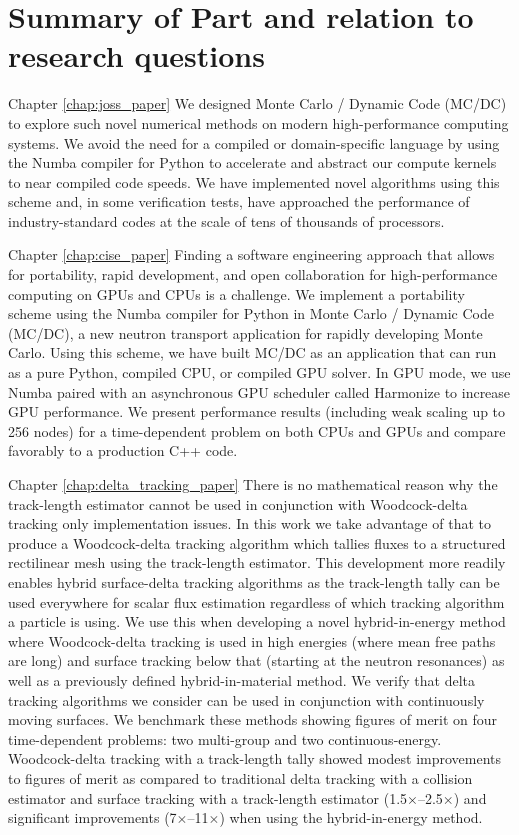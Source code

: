 \section{Summary of Part and relation to research questions}


Chapter \ref{chap:joss_paper}
We designed Monte Carlo / Dynamic Code (MC/DC) to explore such novel numerical methods on modern high-performance computing systems.
We avoid the need for a compiled or domain-specific language by using the Numba compiler for Python to accelerate and abstract our compute kernels to near compiled code speeds.
We have implemented novel algorithms using this scheme and, in some verification tests, have approached the performance of industry-standard codes at the scale of tens of thousands of processors.

Chapter \ref{chap:cise_paper} Finding a software engineering approach that allows for portability, rapid development, and open collaboration for high-performance computing on GPUs and CPUs is a challenge. 
We implement a portability scheme using the Numba compiler for Python in Monte Carlo / Dynamic Code (MC/DC), a new neutron transport application for rapidly developing Monte Carlo. 
Using this scheme, we have built MC/DC as an application that can run as a pure Python, compiled CPU, or compiled GPU solver. 
In GPU mode, we use Numba paired with an asynchronous GPU scheduler called Harmonize to increase GPU performance. We present performance results (including weak scaling up to 256 nodes) for a time-dependent problem on both CPUs and GPUs and compare favorably to a production C++ code.

Chapter \ref{chap:delta_tracking_paper} There is no mathematical reason why the track-length estimator cannot be used in conjunction with Woodcock-delta tracking only implementation issues. 
In this work we take advantage of that to produce a Woodcock-delta tracking algorithm which tallies fluxes to a structured rectilinear mesh using the track-length estimator.
This development more readily enables hybrid surface-delta tracking algorithms as the track-length tally can be used everywhere for scalar flux estimation regardless of which tracking algorithm a particle is using.
We use this when developing a novel hybrid-in-energy method where Woodcock-delta tracking is used in high energies (where mean free paths are long) and surface tracking below that (starting at the neutron resonances) as well as a previously defined hybrid-in-material method.
We verify that delta tracking algorithms we consider can be used in conjunction with continuously moving surfaces.
We benchmark these methods showing figures of merit on four time-dependent problems: two multi-group and two continuous-energy.
Woodcock-delta tracking with a track-length tally showed modest improvements to figures of merit as compared to traditional delta tracking with a collision estimator and surface tracking with a track-length estimator (\num{1.5}$\times$--\num{2.5}$\times$) and significant improvements (\num{7}$\times$--\num{11}$\times$) when using the hybrid-in-energy method.
